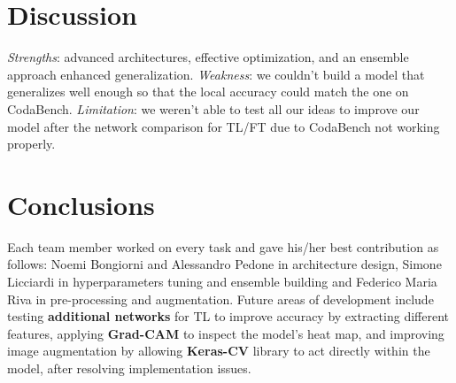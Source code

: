 \documentclass[11pt]{template}
\begin{document}
\begin{multicols}{2}
\section{Discussion}
\textit{Strengths}: advanced architectures, effective optimization, and an ensemble approach enhanced generalization.
\textit{Weakness}: we couldn't build a model that generalizes well enough so that the local accuracy could match the one on CodaBench.
\textit{Limitation}: we weren't able to test all our ideas to improve our model after the network comparison for TL/FT due to CodaBench not working properly.
\section{Conclusions}
Each team member worked on every task and gave his/her best contribution as follows: Noemi Bongiorni and Alessandro Pedone in architecture design, Simone Licciardi in hyperparameters tuning and ensemble building and Federico Maria Riva in pre-processing and augmentation.
Future areas of development include testing \textbf{additional networks} for TL to improve accuracy by extracting different features, applying \textbf{Grad-CAM} to inspect the model's heat map, and improving image augmentation by allowing \textbf{Keras-CV} library to act directly within the model, after resolving implementation issues.

\nocite{*}



\end{multicols}
\end{document}
